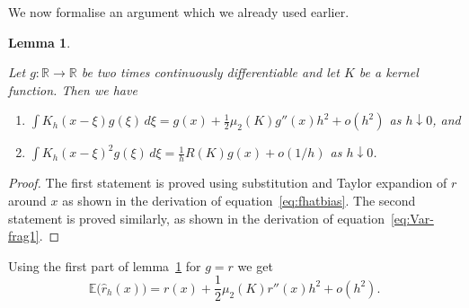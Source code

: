 \documentclass[
  a4paper,
]{article}
\providecommand{\tightlist}{%
  \setlength{\itemsep}{0pt}\setlength{\parskip}{0pt}}
\newtheorem{lemma}{Lemma}[section]
\theoremstyle{definition}
\theoremstyle{definition}
\theoremstyle{definition}
\theoremstyle{definition}
\theoremstyle{remark}
\begin{document}
We now formalise an argument which we already used earlier.

\begin{lemma}
\protect\hypertarget{lem:kernel-limit}{}\label{lem:kernel-limit}

Let \(g\colon \mathbb{R}\to \mathbb{R}\) be two times continuously differentiable
and let \(K\) be a kernel function. Then we have

\begin{enumerate}
\def\labelenumi{\arabic{enumi}.}
\tightlist
\item
  \(\displaystyle\int K_h(x - \xi) g(\xi) \, d\xi = g(x) + \frac12 \mu_2(K) g''(x) h^2 + o(h^2)\)
  as \(h \downarrow 0\), and
\item
  \(\displaystyle\int K_h(x - \xi)^2 g(\xi) \, d\xi = \frac1h R(K) g(x) + o(1/h)\)
  as \(h \downarrow 0\).
\end{enumerate}

\end{lemma}

\begin{proof}
The first statement is proved using substitution and Taylor expandion of \(r\)
around \(x\) as shown in the derivation of equation~\eqref{eq:fhatbias}.
The second statement is proved similarly, as shown in the derivation of
equation~\eqref{eq:Var-frag1}.
\end{proof}

Using the first part of lemma~\ref{lem:kernel-limit} for \(g = r\) we get
\begin{equation*}
  \mathbb{E}\bigl( \hat r_h(x) \bigr)
  = r(x) + \frac12 \mu_2(K) r''(x) h^2 + o(h^2).
\end{equation*}
\end{document}
